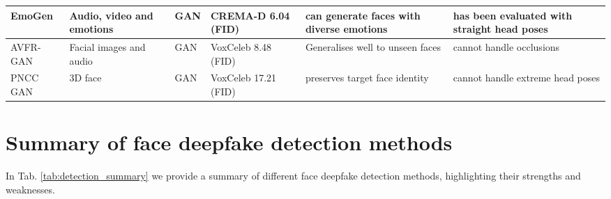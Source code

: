 \begin{table*}[htbp]
{\begin{tabular}{|p{2cm}|p{5cm}|p{2cm}|p{2cm}|p{5cm}|p{5cm}|}
EmoGen \cite{goyal2023emotionally}                 &        Audio, video and emotions                                &    GAN          &    CREMA-D \cite{cao2014crema} 6.04 (FID)         &  can generate faces with diverse emotions         &    has been evaluated with straight head poses        \\ \hline
AVFR-GAN \cite{agarwal2023audio}        &   Facial images and audio                                     &     GAN         &   VoxCeleb \cite{nagrani2017voxceleb} 8.48  (FID)        &  Generalises well to unseen faces         &     cannot handle occlusions       \\ \hline
PNCC GAN  \cite{xue2023high}                &    3D face                                    & GAN             &    VoxCeleb \cite{nagrani2017voxceleb} 17.21 (FID)         &       preserves target face identity    &  cannot handle extreme head poses          \\ \hline
\end{tabular}}
\label{tab:face_reenact_summary}
\end{table*}

\section{Summary of face deepfake detection methods}

In Tab. \ref{tab:detection_summary} we provide a summary of different face deepfake detection methods, highlighting their strengths and weaknesses.



